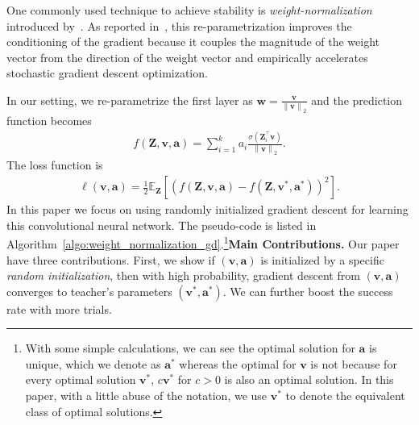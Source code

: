 \documentclass{article}
\newcommand{\firstlayerWN}{v}
\newcommand{\secondlayer}{a}
\def\va{\mathbf{a}}
\def\vv{\mathbf{v}}
\newcommand{\mat}[1]{\mathbf{#1}}
\newcommand{\vect}[1]{\mathbf{#1}}
\newcommand{\norm}[1]{\left\|#1\right\|}
\newcommand{\expect}{\mathbb{E}}
\newcommand{\relu}[1]{\sigma\left(#1\right)}
\begin{document}
One commonly used technique to achieve stability is \emph{weight-normalization} introduced by~\citet{salimans2016weight}. 
As reported in~\cite{salimans2016weight}, this re-parametrization improves the conditioning of the gradient  because it couples the magnitude of the weight vector from the direction of the weight vector and empirically accelerates  stochastic gradient descent optimization.



In our setting, we re-parametrize the first layer as $\vect{w} = \frac{\vect{\firstlayerWN}}{\norm{\vect{\firstlayerWN}}_2}$ and the prediction function becomes
\begin{align}
f\left(\mat{Z},\vect{\firstlayerWN},\vect{\secondlayer}\right) = \sum_{i=1}^{k} {\secondlayer}_i \frac{\relu{\mat{Z}_i^\top \vect{\firstlayerWN}}}{\norm{\vect{\firstlayerWN}}_2}. %
\end{align}
The loss function is
\begin{align}
\ell\left(\vect{\vect{\firstlayerWN},\vect{\secondlayer}}\right) = \frac{1}{2}\expect_{\mat{Z}}\left[\left(f\left(\mat{Z},\vect{\firstlayerWN},\vect{\secondlayer}\right) - f\left(\mat{Z},\vect{\firstlayerWN}^*,\vect{\secondlayer}^*\right)\right)^2\right]. \label{eqn:pop_obj_WN}
\end{align}
In this paper we focus on using randomly initialized gradient descent for learning this convolutional neural network.
The pseudo-code is listed in Algorithm~\ref{algo:weight_normalization_gd}.\footnote{With some simple calculations, we can see the optimal solution for $\vect{\secondlayer}$ is unique, which we denote as $\vect{\secondlayer}^*$ whereas the optimal for $\vect{\firstlayerWN}$ is not because for every optimal solution $\vect{\firstlayerWN}^*$, $c\vect{\firstlayerWN}^*$ for $c>0$ is also an optimal solution.
In this paper, with a little abuse of the notation, we use $\vect{\firstlayerWN}^*$ to denote the equivalent class of optimal solutions.
}\textbf{Main Contributions.} Our paper have three contributions. First, we show if $(\vect{\firstlayerWN},\vect{\secondlayer})$ is initialized by a specific \emph{random initialization}, then with high probability, 
gradient descent from $(\vect{\firstlayerWN},\vect{\secondlayer})$ converges to teacher's parameters $(\vv^*, \va^*)$. We can further boost the success rate with more trials.
\end{document}
